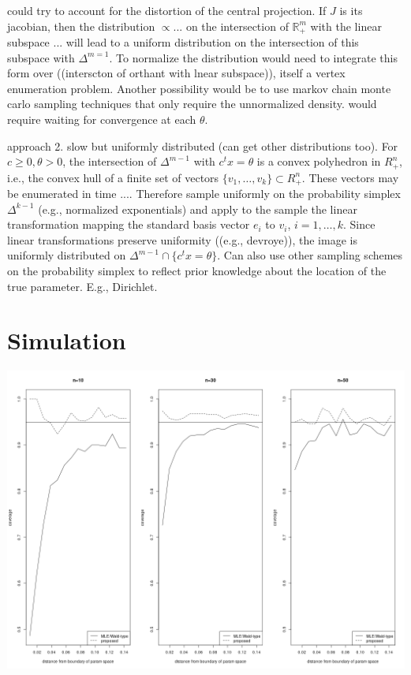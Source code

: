 \documentclass{article}
\renewcommand{\c}c
\newcommand{\posorthant}{R^n_+}
\newcommand{\simp}[1][]{\Delta^{#1}}
\begin{document}
could try to account for the distortion of the central projection. If
$J$ is its jacobian, then the distribution $\propto ...$ on the
intersection of $\mathbb{R}^m_+$ with the linear subspace $...$ will
lead to a uniform distribution on the intersection of this subspace
with $\Delta^{m=1}$. To normalize the distribution would need to
integrate this form over ((interscton of orthant with lnear
subspace)), itself a vertex enumeration problem. Another possibility
would be to use markov chain monte carlo sampling techniques that only
require the unnormalized density. would require waiting for convergence at each $\theta$.


approach 2. slow but uniformly distributed (can get other distributions too). For $c\ge 0, \theta>0$, the intersection of $\simp[m-1]$
with $\c^tx=\theta$ is a convex polyhedron in $\posorthant$, i.e., the
convex hull of a finite set of vectors
$\{v_1,\ldots,v_k\}\subset\posorthant$. These vectors may be
enumerated in time $...$. Therefore sample uniformly on the
probability simplex $\simp[k-1]$ (e.g., normalized exponentials) and
apply to the sample the linear transformation mapping the standard
basis vector $e_i$ to $v_i$, $i=1,\ldots,k$. Since linear
transformations preserve uniformity ((e.g., devroye)), the image is
uniformly distributed on $\simp[m-1]\cap \{\c^tx=\theta\}$. Can also use other sampling schemes on the probability simplex to reflect prior knowledge about the location of the true parameter. E.g., Dirichlet.




\section{Simulation}

\includegraphics[width=\textwidth]{coverage.png}
\end{document}
